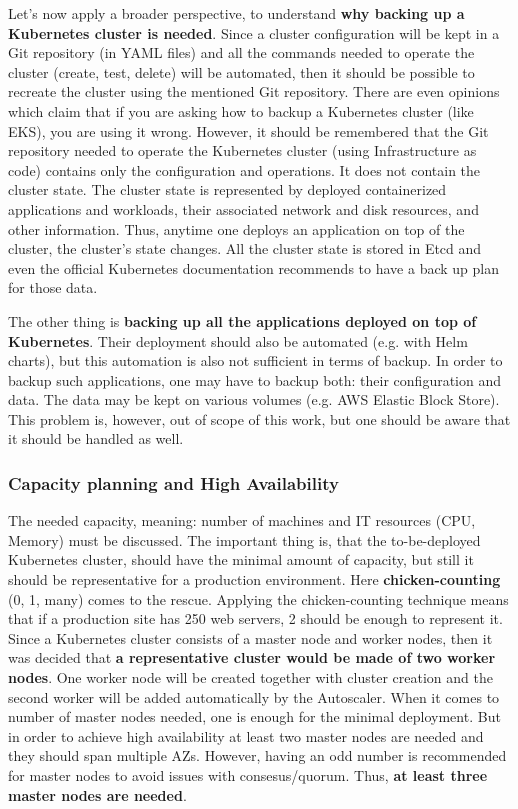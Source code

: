 Let's now apply a broader perspective, to understand \textbf{why backing up a Kubernetes cluster is needed}. Since a cluster configuration will be kept in a Git repository (in YAML files) and all the commands needed to operate the cluster (create, test, delete) will be automated, then it should be possible to recreate the cluster using the mentioned Git repository. There are even opinions which claim that if you are asking how to backup a Kubernetes cluster (like EKS), you are using it wrong\cite{reddit-on-backup}. However, it should be remembered that the Git repository needed to operate the Kubernetes cluster (using Infrastructure as code) contains only the configuration and operations. It does not contain the cluster state. The cluster state is represented by deployed containerized applications and workloads, their associated network and disk resources, and other information\cite{k8s-concepts}. Thus, anytime one deploys an application on top of the cluster, the cluster's state changes. All the cluster state is stored in Etcd and even the official Kubernetes documentation recommends to have a back up plan for those data\cite{k8s-components}.

The other thing is \textbf{backing up all the applications deployed on top of Kubernetes}. Their deployment should also be automated (e.g. with Helm charts), but this automation is also not sufficient in terms of backup. In order to backup such applications, one may have to backup both: their configuration and data. The data may be kept on various volumes (e.g. AWS Elastic Block Store). This problem is, however, out of scope of this work, but one should be aware that it should be handled as well.

\subsubsection{Capacity planning and High Availability}

The needed capacity, meaning: number of machines and IT resources (CPU, Memory) must be discussed. The important thing is, that the to-be-deployed Kubernetes cluster, should have the minimal amount of capacity, but still it should be representative for a production environment. Here \textbf{chicken-counting} (0, 1, many) comes to the rescue. Applying the chicken-counting technique means that if a production site has 250 web servers, 2 should be enough to represent it\cite{book-cicd}. Since a Kubernetes cluster consists of a master node and worker nodes, then it was decided that \textbf{a representative cluster would be made of two worker nodes}. One worker node will be created together with cluster creation and the second worker will be added automatically by the Autoscaler. When it comes to number of master nodes needed, one is enough for the minimal deployment. But in order to achieve high availability at least two master nodes are needed and they should span multiple AZs\cite{article-aws-architecting}. However, having an odd number is recommended for master nodes to avoid issues with consesus/quorum. Thus, \textbf{at least three master nodes are needed}\cite{online-ha-k8s-blog}\cite{online-kops-ha}.

